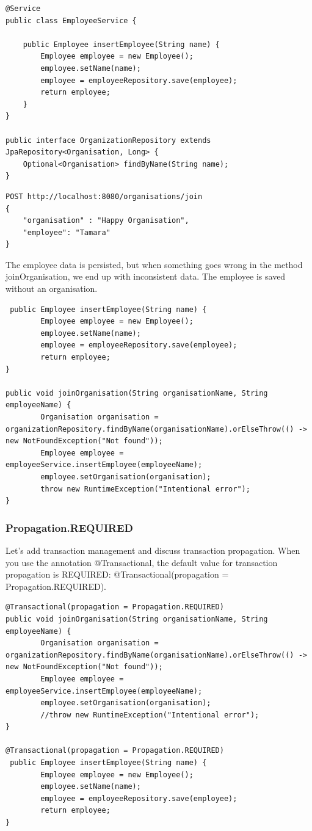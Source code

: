 \begin{lstlisting}
@Service
public class EmployeeService {

    public Employee insertEmployee(String name) {
        Employee employee = new Employee();
        employee.setName(name);
        employee = employeeRepository.save(employee);
        return employee;
    }
}

public interface OrganizationRepository extends JpaRepository<Organisation, Long> {
    Optional<Organisation> findByName(String name);
}

\end{lstlisting}

\begin{verbatim}
POST http://localhost:8080/organisations/join
{
	"organisation" : "Happy Organisation",
	"employee": "Tamara"
}
\end{verbatim}

The employee data is persisted, but when something goes wrong in the method joinOrganisation, we end up with inconsistent data. The employee is saved without an organisation.

\begin{lstlisting}
 public Employee insertEmployee(String name) {
        Employee employee = new Employee();
        employee.setName(name);
        employee = employeeRepository.save(employee);
        return employee;
}

public void joinOrganisation(String organisationName, String employeeName) {
        Organisation organisation = organizationRepository.findByName(organisationName).orElseThrow(() -> new NotFoundException("Not found"));
        Employee employee = employeeService.insertEmployee(employeeName);
        employee.setOrganisation(organisation);
        throw new RuntimeException("Intentional error");
}
\end{lstlisting}

\subsubsection{Propagation.REQUIRED}

Let's add transaction management and discuss transaction propagation.
When you use the annotation @Transactional, the default value for transaction propagation is REQUIRED: @Transactional(propagation = Propagation.REQUIRED).

\begin{lstlisting}
@Transactional(propagation = Propagation.REQUIRED)
public void joinOrganisation(String organisationName, String employeeName) {
        Organisation organisation = organizationRepository.findByName(organisationName).orElseThrow(() -> new NotFoundException("Not found"));
        Employee employee = employeeService.insertEmployee(employeeName);
        employee.setOrganisation(organisation);
        //throw new RuntimeException("Intentional error");
}

@Transactional(propagation = Propagation.REQUIRED)
 public Employee insertEmployee(String name) {
        Employee employee = new Employee();
        employee.setName(name);
        employee = employeeRepository.save(employee);
        return employee;
}
\end{lstlisting}

